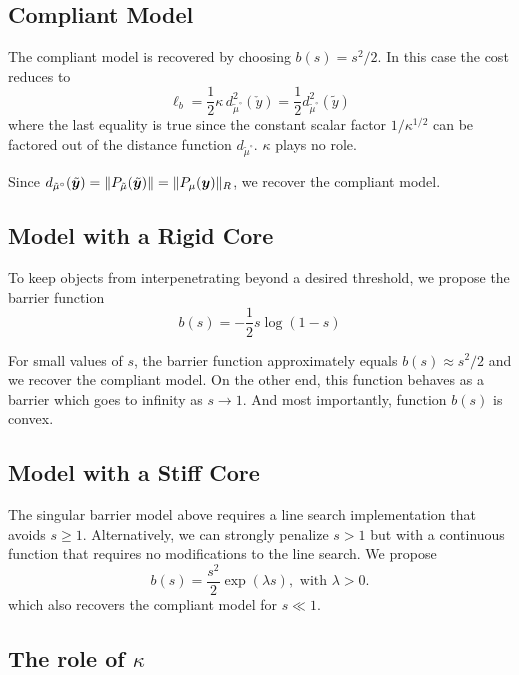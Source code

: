 \subsection{Compliant Model}

The compliant model is recovered by choosing $b(s)=s^2/2$. In this case the cost
reduces to
\begin{equation}
    \ell_b = \frac{1}{2}\kappa\,d_{\tilde{\mu}^\circ}^2(\check{y}) = 
    \frac{1}{2}d_{\tilde{\mu}^\circ}^2(\tilde{y})
\end{equation}
where the last equality is true since the constant scalar factor
$1/\kappa^{1/2}$ can be factored out of the distance function
$d_{\tilde{\mu}^\circ}$. $\kappa$ plays no role.

Since $d_{\tilde{\mu}^\circ}(\tilde{{\bm{y}}}) = \Vert
P_{\tilde\mu}(\tilde{{\bm{y}}}) \Vert = \Vert P_{\mu}({\bm{y}}) \Vert_R$, we recover
the compliant model.

\subsection{Model with a Rigid Core}

To keep objects from interpenetrating beyond a desired threshold, we propose the
barrier function
\begin{equation}
    b(s) = -\frac{1}{2}s\log(1-s)
\end{equation}

For small values of $s$, the barrier function approximately equals $b(s)\approx
s^2/2$ and we recover the compliant model. On the other end, this function
behaves as a barrier which goes to infinity as $s\rightarrow 1$. And most
importantly, function $b(s)$ is convex.

\subsection{Model with a Stiff Core}
The singular barrier model above requires a line search implementation that
avoids $s \ge 1$. Alternatively, we can strongly penalize $s>1$ but
with a continuous function that requires no modifications to the line search.
We propose
\begin{equation}
    b(s) = \frac{s^2}{2}\exp(\lambda s), \text{ with }\lambda>0.
\end{equation}
which also recovers the compliant model for $s\ll 1$.

\subsection{The role of $\kappa$}

